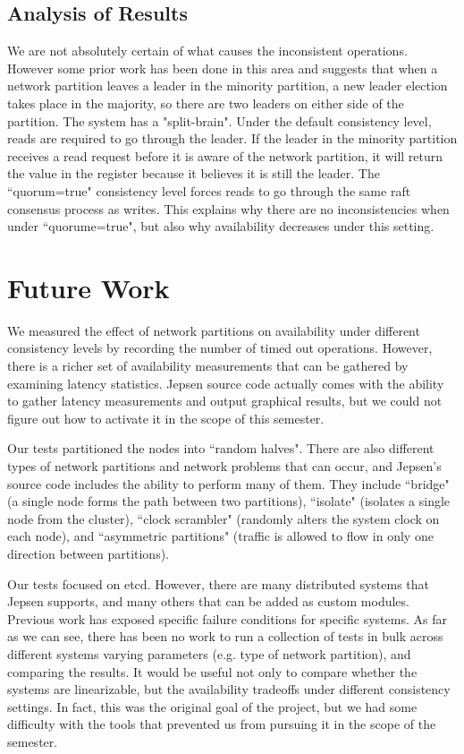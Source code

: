 \documentclass[12pt,conference]{IEEEtran}
\begin{document}
\subsection{Analysis of Results}

We are not absolutely certain of what causes the inconsistent operations. However some prior work\cite{jepsenetcd} has been done in this area and suggests that when a network partition leaves a leader in the minority partition, a new leader election takes place in the majority, so there are two leaders on either side of the partition. The system has a "split-brain". Under the default consistency level, reads are required to go through the leader. If the leader in the minority partition receives a read request before it is aware of the network partition, it will return the value in the register because it believes it is still the leader. The ``quorum=true" consistency level forces reads to go through the same raft consensus process as writes. This explains why there are no inconsistencies when under ``quorume=true", but also why availability decreases under this setting.

\section{Future Work}

We measured the effect of network partitions on availability under different consistency levels by recording the number of timed out operations. However, there is a richer set of availability measurements that can be gathered by examining latency statistics. Jepsen source code actually comes with the ability to gather latency measurements and output graphical results, but we could not figure out how to activate it in the scope of this semester.

Our tests partitioned the nodes into ``random halves". There are also different types of network partitions and network problems that can occur, and Jepsen's source code includes the ability to perform many of them. They include ``bridge" (a single node forms the path between two partitions), ``isolate" (isolates a single node from the cluster), ``clock scrambler" (randomly alters the system clock on each node), and ``asymmetric partitions" (traffic is allowed to flow in only one direction between partitions).

Our tests focused on etcd. However, there are many distributed systems that Jepsen supports, and many others that can be added as custom modules. Previous work has exposed specific failure conditions for specific systems. As far as we can see, there has been no work to run a collection of tests in bulk across different systems varying parameters (e.g. type of network partition), and comparing the results. It would be useful not only to compare whether the systems are linearizable, but the availability tradeoffs under different consistency settings. In fact, this was the original goal of the project, but we had some difficulty with the tools that prevented us from pursuing it in the scope of the semester.
\end{document}
